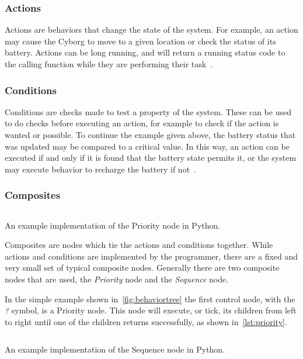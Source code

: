 \documentclass[\rootfolder/main.tex]{subfiles}
\begin{document}
\subsubsection{Actions}

Actions are behaviors that change the state of the system.
For example, an action may cause the Cyborg to move to a given location or check the status of its battery.
Actions can be long running, and will return a running status code to the calling function while they are performing their task~\cite{Millington2009}.

\subsubsection{Conditions}

Conditions are checks made to test a property of the system.
These can be used to do checks before executing an action, for example to check if the action is wanted or possible.
To continue the example given above, the battery status that was updated may be compared to a critical value.
In this way, an action can be executed if and only if it is found that the battery state permits it, or the system may execute behavior to recharge the battery if not~\cite{Millington2009}.

\subsubsection{Composites}

\begin{listing}
    \inputminted{python}{\rootfolder/Chapters/Chapter2/Listings/priority.py}
    \caption{An example implementation of the Priority node in Python.}
    \label{lst:priority}
\end{listing}

Composites are nodes which tie the actions and conditions together.
While actions and conditions are implemented by the programmer, there are a fixed and very small set of typical composite nodes.
Generally there are two composite nodes that are used, the \emph{Priority} node and the \emph{Sequence} node.

In the simple example shown in~\cref{fig:behaviortree} the first control node, with the \emph{?} symbol, is a Priority node.
This node will execute, or tick, its children from left to right until one of the children returns successfully, as shown in~\cref{lst:priority}.

\begin{listing}
    \inputminted{python}{\rootfolder/Chapters/Chapter2/Listings/sequence.py}
    \caption{An example implementation of the Sequence node in Python.}
    \label{lst:sequence}
\end{listing}
\end{document}
